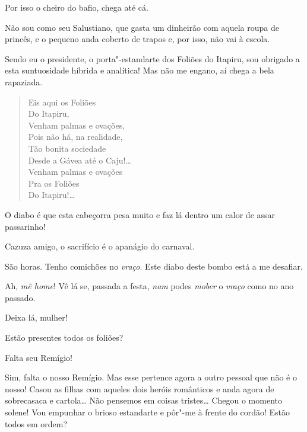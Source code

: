  Por isso o cheiro do bafio, chega até cá.

 Não sou como seu Salustiano, que gasta um dinheirão com
aquela roupa de princês, e o pequeno anda coberto de trapos e, por isso, não vai
à escola. 

 Sendo eu o presidente, o porta"-estandarte dos
Foliões do Itapiru, sou obrigado a esta suntuosidade híbrida e
analítica! Mas não me engano, aí chega a bela rapaziada.


\begin{verse}
Eis aqui os Foliões\\
\quad Do Itapiru,\\
Venham palmas e ovações,\\
Pois não há, na realidade,\\
Tão bonita sociedade\\
Desde a Gávea até o Caju!\ldots{}\\
Venham palmas e ovações\\
\quad Pra os Foliões\\
\quad Do Itapiru!\ldots
\end{verse}

  O diabo é que esta cabeçorra
pesa muito e faz lá dentro um calor de assar passarinho!

 Cazuza amigo, o sacrifício é o apanágio do carnaval.

 São horas. Tenho comichões no \textit{vraço}.  Este diabo deste bombo está a
me desafiar.

 Ah, \textit{mê home}! Vê lá se, passada a festa,
\textit{nam} podes \textit{mober} o \textit{vraço} como no ano passado.

 Deixa lá, mulher!

 Estão presentes todos os foliões?

 Falta seu Remígio!

 Sim, falta o nosso Remígio. Mas esse pertence agora a
outro pessoal que não é o nosso! Casou as filhas com aqueles dois heróis
românticos e anda agora de sobrecasaca e cartola\ldots{} Não pensemos em coisas
tristes\ldots{}  Chegou o momento solene! Vou
empunhar o brioso estandarte e 
pôr"-me à frente do cordão! Estão todos em ordem?

